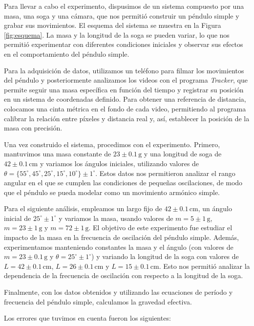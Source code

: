 \documentclass[12pt,a4]{article}
\begin{document}
Para llevar a cabo el experimento, dispusimos de un sistema compuesto por una masa, una soga y una cámara, que nos permitió construir un péndulo simple y grabar sus movimientos. El esquema del sistema se muestra en la Figura \ref{fig:esquema}. La masa y la longitud de la soga se pueden variar, lo que nos permitió experimentar con diferentes condiciones iniciales y observar sus efectos en el comportamiento del péndulo simple.

Para la adquisición de datos, utilizamos un teléfono para filmar los movimientos del péndulo y posteriormente analizamos los videos con el programa \textit{Tracker}, que permite seguir una masa específica en función del tiempo y registrar su posición en un sistema de coordenadas definido. Para obtener una referencia de distancia, colocamos una cinta métrica en el fondo de cada video, permitiendo al programa calibrar la relación entre píxeles y distancia real y, así, establecer la posición de la masa con precisión.

Una vez construido el sistema, procedimos con el experimento. Primero, mantuvimos una masa constante de $23 \pm 0.1 \, \text{g}$ y una longitud de soga de $42 \pm 0.1 \, \text{cm}$ y variamos los ángulos iniciales, utilizando valores de $\theta = \{55^\circ, 45^\circ, 25^\circ, 15^\circ, 10^\circ\} \pm 1^\circ$. Estos datos nos permitieron analizar el rango angular en el que se cumplen las condiciones de pequeñas oscilaciones, de modo que el péndulo se pueda modelar como un movimiento armónico simple.

Para el siguiente análisis, empleamos un largo fijo de $42 \pm 0.1 \, \text{cm}$, un ángulo inicial de $25^\circ \pm 1^\circ$ y variamos la masa, usando valores de $m = 5 \pm 1 \, \text{g}$, $m = 23 \pm 1 \, \text{g}$ y $m = 72 \pm 1 \, \text{g}$. El objetivo de este experimento fue estudiar el impacto de la masa en la frecuencia de oscilación del péndulo simple. Además, experimentamos manteniendo constantes la masa y el ángulo (con valores de $m = 23 \pm 0.1 \, \text{g}$ y $\theta = 25^\circ \pm 1^\circ$) y variando la longitud de la soga con valores de $L = 42 \pm 0.1 \, \text{cm}$, $L = 26 \pm 0.1 \, \text{cm}$ y $L = 15 \pm 0.1 \, \text{cm}$. Esto nos permitió analizar la dependencia de la frecuencia de oscilación con respecto a la longitud de la soga.

Finalmente, con los datos obtenidos y utilizando las ecuaciones de período y frecuencia del péndulo simple, calculamos la gravedad efectiva.


Los errores que tuvimos en cuenta fueron los siguientes:
\end{document}
